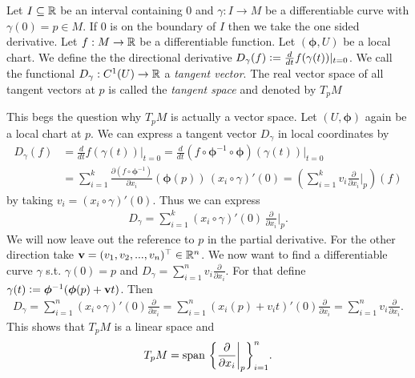 \documentclass[../master_thesis.tex]{subfiles}
\begin{document}
\begin{definition}
    Let $I \subseteq \mathbb{R}$ be an interval containing $0$ and 
    $\gamma: I \rightarrow M$ be a differentiable curve with $\gamma(0) = p \in M$.
    If $0$ is on the boundary of $I$ then we take the one sided derivative.
    Let $f:M \rightarrow \mathbb{R}$ be a differentiable function. Let
    $(\boldsymbol{\phi},U)$ be a local chart.
    We define the the directional derivative 
    $D_\gamma(f) \vcentcolon= \frac{d}{dt} f(\gamma(t)) |_{t=0}$.
    We call the functional $D_\gamma: C^1(U) \rightarrow \mathbb{R}$ 
    a \textit{tangent vector}. 
    The real vector space of all tangent vectors at $p$ is called the 
    \textit{tangent space} and denoted by $T_p M$    
\end{definition}
This begs the question why $T_p M$ is actually a vector space. Let $(U,\boldsymbol{\phi})$ 
again be a local chart at $p$.
We can 
express a tangent vector $D_\gamma$ in local coordinates by 
\begin{align}
    D_\gamma(f) &=  \frac{d}{dt} f(\gamma(t)) \big|_{t=0}
    =  \frac{d}{dt} (f \circ \boldsymbol{\phi}^{-1} \circ \boldsymbol{\phi})  (\gamma(t)) \big|_{t=0}
    \\ &= \sum\limits_{i=1}^k \frac{\partial (f \circ \boldsymbol{\phi}^{-1})}{\partial x_i} 
        (\boldsymbol{\phi}(p))
        \, (x_i\circ \gamma)'(0)
    = (\sum\limits_{i=1}^k v_i  \frac{\partial}{\partial x_i}\Big|_p )(f)
\end{align}
by taking $v_i = (x_i\circ \gamma)'(0)$. Thus we can express 
\begin{align*}
    D_\gamma = \sum\limits_{i=1}^k 
    (x_i \circ \gamma)' (0) \, \frac{\partial}{\partial x_i}\bigg|_p.
\end{align*}
We will now leave out the reference to $p$ in the partial derivative.
For the other direction take $\mathbf{v} = (v_1, v_2, ..., v_n)^\top \in \mathbb{R}^n$. 
We now want to find a differentiable curve $\gamma$ s.t. $\gamma(0) = p$ 
and $D_\gamma = \sum_{i=1}^n v_i \frac{\partial}{\partial x_i}$.
For that define $\gamma(t) \vcentcolon= \boldsymbol{\phi}^{-1} (\boldsymbol{\phi}(p) + \mathbf{v}t)$.
Then
\begin{align*}
    D_\gamma = \sum_{i=1}^n (x_i\circ \gamma)'(0) \frac{\partial}{\partial x_i}
    = \sum_{i=1}^n (x_i(p) + v_i t)'(0) \frac{\partial}{\partial x_i}
    = \sum_{i=1}^n v_i \frac{\partial}{\partial x_i}.
\end{align*}
This shows that $T_p M$ is a linear space and 
\begin{align*}
    T_p M = \operatorname{span}\, 
        \bigg\{ \frac{\partial}{\partial x_i}\bigg|_p \bigg\}_{i=1}^n.
\end{align*}
\end{document}
